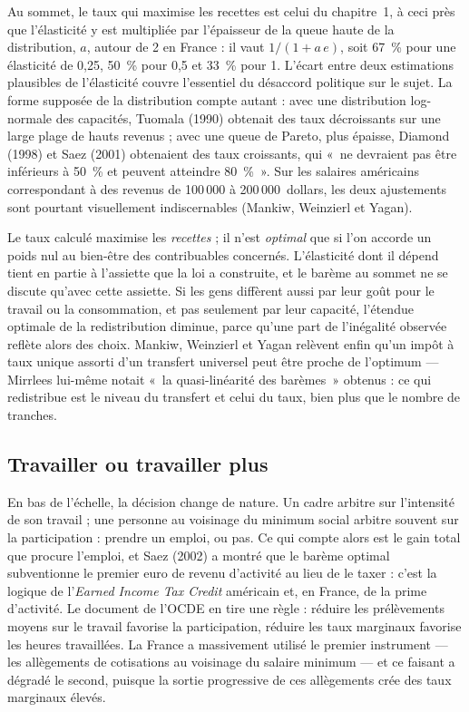 \documentclass[11pt,a4paper]{article}
\begin{document}
Au sommet, le taux qui maximise les recettes est celui du chapitre~1, à ceci près que l'élasticité
y est multipliée par l'épaisseur de la queue haute de la distribution, $a$, autour de 2 en France :
il vaut $1/(1+a\,e)$, soit 67~\% pour une élasticité de 0,25, 50~\% pour 0,5 et 33~\% pour 1. L'écart entre deux estimations plausibles de l'élasticité couvre
l'essentiel du désaccord politique sur le sujet. La forme supposée de la distribution compte
autant : avec une distribution log-normale des capacités, Tuomala (1990) obtenait des taux
décroissants sur une large plage de hauts revenus ; avec une queue de Pareto, plus épaisse, Diamond
(1998) et Saez (2001) obtenaient des taux croissants, qui «~ne devraient pas être inférieurs à
50~\% et peuvent atteindre 80~\%~». Sur les salaires américains correspondant à des revenus de
100\,000 à 200\,000~dollars, les deux ajustements sont pourtant visuellement indiscernables
(Mankiw, Weinzierl et Yagan).

Le taux calculé maximise les \emph{recettes} ; il n'est \emph{optimal} que si l'on accorde un poids
nul au bien-être des contribuables concernés. L'élasticité dont il dépend tient en partie à
l'assiette que la loi a construite, et le barème au sommet ne se discute qu'avec cette assiette. Si
les gens diffèrent aussi par leur goût pour le travail ou la consommation, et pas seulement par
leur capacité, l'étendue optimale de la redistribution diminue, parce qu'une part de l'inégalité
observée reflète alors des choix. Mankiw, Weinzierl et Yagan relèvent enfin qu'un impôt à taux
unique assorti d'un transfert universel peut être proche de l'optimum --- Mirrlees lui-même notait
«~la quasi-linéarité des barèmes~» obtenus : ce qui redistribue est le niveau du transfert et celui
du taux, bien plus que le nombre de tranches.

\subsection{Travailler ou travailler plus}

En bas de l'échelle, la décision change de nature. Un cadre arbitre sur l'intensité de son travail ;
une personne au voisinage du minimum social arbitre souvent sur la participation : prendre un
emploi, ou pas. Ce qui compte alors est le gain total que procure l'emploi, et Saez (2002) a montré
que le barème optimal subventionne le premier euro de revenu d'activité au lieu de le taxer : c'est
la logique de l'\emph{Earned Income Tax Credit} américain et, en France, de la prime d'activité.
Le document de l'OCDE en tire une règle : réduire les prélèvements moyens sur le travail favorise
la participation, réduire les taux marginaux favorise les heures travaillées. La France a
massivement utilisé le premier instrument --- les allègements de cotisations au voisinage du
salaire minimum --- et ce faisant a dégradé le second, puisque la sortie progressive de ces
allègements crée des taux marginaux élevés.
\end{document}
